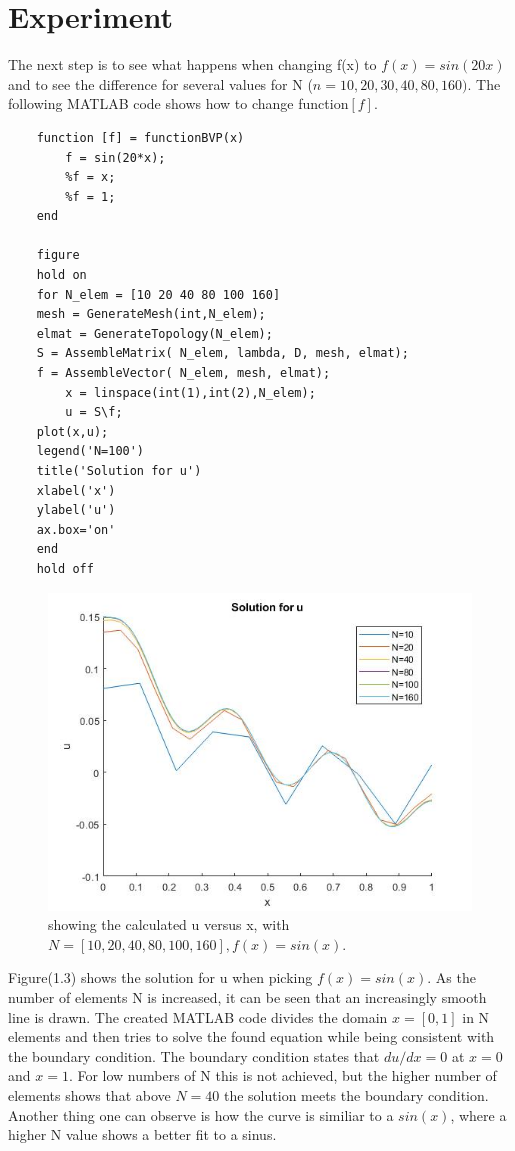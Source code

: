 \documentclass[a4paper]{report}
\begin{document}
\section{Experiment}

The next step is to see what happens when changing f(x) to $f(x)=sin(20x)$ and to see the difference for several values for N ($n=10,20,30,40,80,160)$. The following MATLAB code shows how to change function$[f]$.

\vspace{5mm}
\begin{lstlisting}
	function [f] = functionBVP(x)
		f = sin(20*x);
		%f = x;
		%f = 1;
	end
	
	figure 
	hold on
	for N_elem = [10 20 40 80 100 160]
	mesh = GenerateMesh(int,N_elem);
	elmat = GenerateTopology(N_elem);
	S = AssembleMatrix( N_elem, lambda, D, mesh, elmat);
	f = AssembleVector( N_elem, mesh, elmat);
		x = linspace(int(1),int(2),N_elem);
		u = S\f;
	plot(x,u);
	legend('N=100')
	title('Solution for u')
	xlabel('x')
	ylabel('u')
	ax.box='on'
	end
	hold off
\end{lstlisting}

\newpage

\begin{figure}[ht!]
	\centering
	\includegraphics[width=150mm]{1Dfsinx.jpg}
	\caption{showing the calculated u versus x, with  $N =[10, 20, 40, 80, 100, 160],f(x)=sin(x)$. 
	\label{overflow}}
\end{figure}

Figure(1.3) shows the solution for u when picking $f(x)=sin(x)$. As the number of elements N is increased, it can be seen that an increasingly smooth line is drawn. The created MATLAB code divides the domain $x=[0,1]$ in N elements and then tries to solve the found equation while being consistent with the boundary condition. The boundary condition states that $du/dx =0$ at $x=0$ and $x=1$. For low numbers of N this is not achieved, but the higher number of elements shows that above $N=40$ the solution meets the boundary condition. Another thing one can observe is how the curve is similiar to a $sin(x)$, where a higher N value shows a better fit to a sinus.
\end{document}
